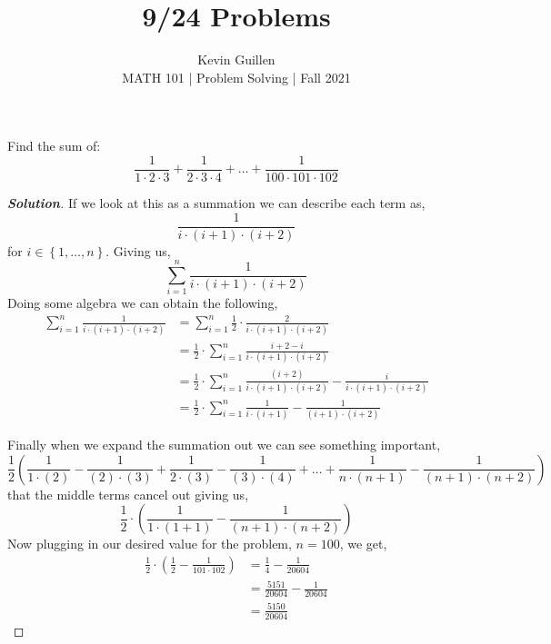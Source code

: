 \documentclass[12pt]{article}
\newenvironment{problem}[2][Problem\!]{\begin{trivlist}
\item[\hskip \labelsep {\bfseries #1}\hskip \labelsep {\bfseries #2.}]}{\end{trivlist}}
\newenvironment{solution}{\begin{proof}[\textbf{\textit{Solution}}]}{\end{proof}}
\newcommand{\set}[1]{\left\{#1\right\}} %
\begin{document}
 
\title{9/24 Problems}
\author{Kevin Guillen\\[0.5cm]
MATH 101 | Problem Solving | Fall 2021}
\date{} 
\maketitle


\begin{problem}{1}
Find the sum of:
\[\frac{1}{1 \cdot 2\cdot 3} + \frac{1}{2 \cdot 3 \cdot 4} + \dots + \frac{1}{100 \cdot 101 \cdot 102}\]

\begin{solution}
    If we look at this as a summation we can describe each term as, 
    \[\frac{1}{i \cdot (i +1) \cdot (i+2)} \] 
    for $i\in \set{1, \dots, n}$. Giving us,
    \[\sum_{i=1}^n \frac{1}{i \cdot (i +1) \cdot (i+2)}\]
    Doing some algebra we can obtain the following,
    \begin{align*}
        \sum_{i=1}^n \frac{1}{i \cdot (i +1) \cdot (i+2)} &= \sum_{i=1}^n \frac{1}{2}\cdot \frac{2}{i \cdot (i +1) \cdot (i+2)} \\
        &= \frac{1}{2} \cdot \sum_{i=1}^n \frac{i + 2 - i}{i \cdot (i +1) \cdot (i+2)} \\
        &= \frac{1}{2} \cdot\sum_{i=1}^n  \frac{(i + 2)}{i \cdot (i +1) \cdot (i+2)} - \frac{i}{i \cdot (i +1) \cdot (i+2)} \\
        &= \frac{1}{2} \cdot\sum_{i=1}^n  \frac{1}{i \cdot (i +1)} - \frac{1}{(i +1) \cdot (i+2)}
    \end{align*}

    \noindent Finally when we expand the summation out we can see something important,
    \[\frac{1}{2}\left(\frac{1}{1 \cdot (2)} - \frac{1}{(2)\cdot(3)} + \frac{1}{2\cdot(3)} - \frac{1}{(3)\cdot(4)}+ \dots + \frac{1}{n \cdot(n+1)}-\frac{1}{(n +1)\cdot(n + 2)}\right)\]
    that the middle terms cancel out giving us,
    \[\frac{1}{2} \cdot \left(\frac{1}{1\cdot(1+1)} - \frac{1}{(n+1)\cdot(n+2)}\right)\]
    Now plugging in our desired value for the problem, $n = 100$, we get,
    \begin{align*}
        \frac{1}{2} \cdot \left(\frac{1}{2} - \frac{1}{101 \cdot 102} \right) &= \frac{1}{4} - \frac{1}{20604} \\ 
        &= \frac{5151}{20604} - \frac{1}{20604}  \\
        &= \frac{5150}{20604}
    \end{align*}
    \end{solution}
\end{problem}
\end{document}
